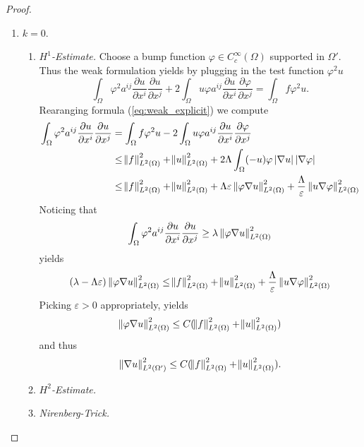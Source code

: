 \begin{proof}
	\begin{enumerate}[label = \emph{Step \arabic*:}, wide = 0pt]
		\item $k = 0$. 
			\begin{enumerate}[label = \textup{(}\roman*\textup{)},wide = 0pt]
				\item \emph{$H^1$-Estimate.} Choose a bump function $\varphi \in C^\infty_c(\Omega)$ supported in $\Omega'$. Thus the weak formulation yields by plugging in the test function $\varphi^2 u$
					\begin{equation}
						\label{eq:weak_explicit}
						\int_\Omega \varphi^2 a^{ij}\frac{\partial u}{\partial x^i}\frac{\partial u}{\partial x^j} + 2\int_{\Omega} u\varphi a^{ij}\frac{\partial u}{\partial x^i}\frac{\partial \varphi}{\partial x^j} = \int_\Omega f \varphi^2 u.
					\end{equation}
					Rearanging formula (\ref{eq:weak_explicit}) we compute
					\begin{align*}
						\int_\Omega \varphi^2 a^{ij}\frac{\partial u}{\partial x^i}\frac{\partial u}{\partial x^j} &= \int_\Omega f \varphi^2 u -  2\int_{\Omega} u\varphi a^{ij}\frac{\partial u}{\partial x^i}\frac{\partial \varphi}{\partial x^j}\\
						&\leq \norm{f}_{L^2(\Omega)}^2 + \norm{u}_{L^2(\Omega)}^2 + 2 \Lambda \int_\Omega (-u)\varphi \abs[0]{\nabla u}\abs[0]{\nabla \varphi}\\
						&\leq \norm{f}_{L^2(\Omega)}^2 + \norm{u}_{L^2(\Omega)}^2 + \Lambda \varepsilon \norm[0]{\varphi\nabla u}_{L^2(\Omega)}^2 + \frac{\Lambda}{\varepsilon}\norm[0]{u \nabla \varphi}_{L^2(\Omega)}^2
					\end{align*}
					Noticing that
					\begin{equation*}
						\int_\Omega \varphi^2 a^{ij}\frac{\partial u}{\partial x^i}\frac{\partial u}{\partial x^j} \geq \lambda \norm[0]{\varphi\nabla u}_{L^2(\Omega)}^2
					\end{equation*}
					\noindent yields
					\begin{equation*}
						(\lambda - \Lambda \varepsilon) \norm[0]{\varphi\nabla u}_{L^2(\Omega)}^2 \leq  \norm{f}_{L^2(\Omega)}^2 + \norm{u}_{L^2(\Omega)}^2 + \frac{\Lambda}{\varepsilon}\norm[0]{u \nabla \varphi}_{L^2(\Omega)}^2
					\end{equation*}
					Picking $\varepsilon > 0$ appropriately, yields
					\begin{equation*}
						\norm[0]{\varphi\nabla u}_{L^2(\Omega)}^2 \leq  C(\norm{f}_{L^2(\Omega)}^2 + \norm{u}_{L^2(\Omega)}^2)
					\end{equation*}
					\noindent and thus
					\begin{equation*}
						\norm[0]{\nabla u}_{L^2(\Omega')}^2 \leq C(\norm{f}_{L^2(\Omega)}^2 + \norm{u}_{L^2(\Omega)}^2).
					\end{equation*}
				\item \emph{$H^2$-Estimate.}
				\item \emph{Nirenberg-Trick.} 
			\end{enumerate}
	\end{enumerate}
\end{proof}

